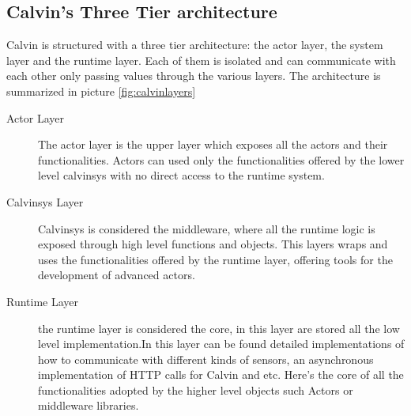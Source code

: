 \begin{itemize}
\subsection{Calvin's Three Tier architecture}

Calvin is structured with a three tier architecture: the actor layer, the system layer and the runtime layer.
Each of them is isolated and can communicate with each other only passing values through the various
layers. The architecture is summarized in picture \ref{fig:calvinlayers}

\begin{description}
    \item[Actor Layer] The actor layer is the upper layer which exposes all the actors and their functionalities.
    Actors can used only the functionalities offered by the lower level calvinsys with no direct access to the runtime
    system.
    \item[Calvinsys Layer] Calvinsys is considered the middleware, where all the runtime logic is exposed through
    high level functions and objects. This layers wraps and uses the functionalities offered by the runtime layer,
    offering tools for the development of advanced actors.
    \item[Runtime Layer] the runtime layer is considered the core, in this layer are stored all the low level
    implementation.In this layer can be found detailed implementations of how to communicate with different kinds
    of sensors, an asynchronous implementation of HTTP calls for Calvin and etc. Here's the core of all
    the functionalities adopted by the higher level objects such Actors or middleware libraries.
\end{description}


\end{itemize}
